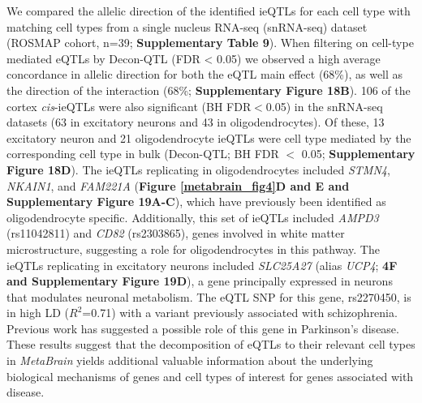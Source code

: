 We compared the allelic direction of the identified ieQTLs for each cell type with matching cell types from a single nucleus RNA-seq (snRNA-seq) dataset (ROSMAP cohort, n=39; \textbf{Supplementary Table 9})\cite{mathysSinglecellTranscriptomicAnalysis2019}. When filtering on cell-type mediated eQTLs by Decon-QTL (FDR < 0.05) we observed a high average concordance in allelic direction for both the eQTL main effect (68\%), as well as the direction of the interaction (68\%; \textbf{Supplementary Figure 18B}). 106 of the cortex \textit{cis}-ieQTLs were also significant (BH FDR$<$0.05) in the snRNA-seq datasets (63 in excitatory neurons and 43 in oligodendrocytes). Of these, 13 excitatory neuron and 21 oligodendrocyte ieQTLs were cell type mediated by the corresponding cell type in bulk (Decon-QTL; BH FDR $<$ 0.05; \textbf{Supplementary Figure 18D}). The ieQTLs replicating in oligodendrocytes included \textit{STMN4}, \textit{NKAIN1}, and \textit{FAM221A} (\textbf{Figure \ref{metabrain_fig4}D and E and Supplementary Figure 19A-C}), which have previously been identified as oligodendrocyte specific\cite{ngUsingTranscriptomicHidden2019}. Additionally, this set of ieQTLs included \textit{AMPD3} (rs11042811) and \textit{CD82} (rs2303865), genes involved in white matter microstructure\cite{zhaoLargescaleGWASReveals2019}, suggesting a role for oligodendrocytes in this pathway. The ieQTLs replicating in excitatory neurons included \textit{SLC25A27} (alias \textit{UCP4}; \textbf{4F and Supplementary Figure 19D}), a gene principally expressed in neurons\cite{smorodchenkoComparativeAnalysisUncoupling2009} that modulates neuronal metabolism\cite{liuMitochondrialUCP4Mediates2006}. The eQTL SNP for this gene, rs2270450, is in high LD ($R^2$=0.71) with a variant previously associated with schizophrenia\cite{yasunoSynergisticAssociationMitochondrial2007}. Previous work has suggested a possible role of this gene in Parkinson’s disease\cite{ramsdenHumanNeuronalUncoupling2012,hoMitochondrialNeuronalUncoupling2012}. These results suggest that the decomposition of eQTLs to their relevant cell types in \textit{MetaBrain} yields additional valuable information about the underlying biological mechanisms of genes and cell types of interest for genes associated with disease.


